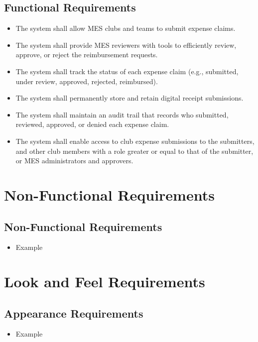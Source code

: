 \documentclass[12pt]{article}
\begin{document}
  \subsection{Functional Requirements}
    \begin{itemize}
      \item The system shall allow MES clubs and teams to submit expense claims.
      \item The system shall provide MES reviewers with tools to efficiently review, approve, or reject the reimbursement requests.
      \item The system shall track the status of each expense claim (e.g., submitted, under review, approved, rejected, reimbursed).
      \item The system shall permanently store and retain digital receipt submissions.
      \item The system shall maintain an audit trail that records who submitted, reviewed, approved, or denied each expense claim.
      \item The system shall enable access to club expense submissions to the submitters, and other club members with a role greater or equal to that of the submitter, or MES administrators and approvers.
    \end{itemize}

\section{Non-Functional Requirements}
  \subsection{Non-Functional Requirements}
    \begin{itemize}
        \item Example
      \end{itemize}

\section{Look and Feel Requirements}
  \subsection{Appearance Requirements}
    \begin{itemize}
      \item Example
    \end{itemize}
\end{document}
